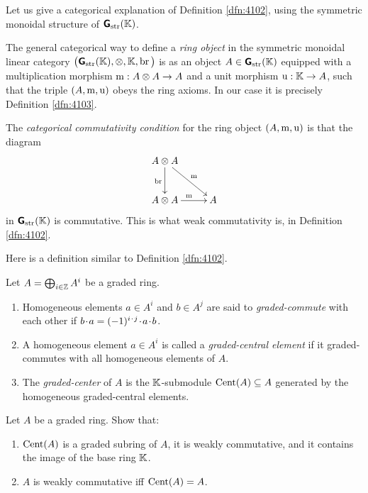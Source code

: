 \begin{rem} \label{rem:4103}
Let us give a categorical explanation of Definition \ref{dfn:4102}, using the 
symmetric monoidal structure of $\boldsymbol{\mathsf{G}}_{\mathrm{str}}(\mathbb{K})$. 

The general categorical way to define a {\em ring object} in the symmetric
monoidal linear category
$\bigl( \boldsymbol{\mathsf{G}}_{\mathrm{str}}(\mathbb{K}), \otimes, \mathbb{K}, \operatorname{br} \big)$
is as an object $A \in \boldsymbol{\mathsf{G}}_{\mathrm{str}}(\mathbb{K})$ equipped with a 
multiplication morphism 
$\operatorname{m} : A \otimes A \to A$
and a unit morphism $\operatorname{u} : \mathbb{K} \to A$, such that the triple 
$(A, \operatorname{m}, \operatorname{u})$ obeys the ring axioms. 
In our case it is precisely Definition \ref{dfn:4103}.

The {\em categorical commutativity condition} for the ring object 
$(A, \operatorname{m}, \operatorname{u})$  is that the diagram 
\[ \UseTips  \xymatrix @C=6ex @R=6ex {
A \ot A
\ar[dr]^{\opn{m}}
\ar[d]_{\opn{br}}
\\
A \ot A
\ar[r]^{\opn{m}}
&
A
} \]
in $\boldsymbol{\mathsf{G}}_{\mathrm{str}}(\mathbb{K})$ is commutative. This is what weak commutativity 
is, in Definition \ref{dfn:4102}.
\end{rem}

Here is a definition similar to Definition \ref{dfn:4102}.

\begin{dfn} \label{dfn:4105}
Let $A = \bigoplus_{i \in \mathbb{Z}} A^i$ be a graded ring.
\begin{enumerate}
\item Homogeneous elements $a \in A^i$ and $b \in A^j$ are said to {\em 
graded-commute} with each other if 
$b \mspace{1.5mu}{\cdot}\mspace{1.5mu} a = (-1)^{i \mspace{1.5mu}{\cdot}\mspace{1.5mu} j} \mspace{1.5mu}{\cdot}\mspace{1.5mu} a \mspace{1.5mu}{\cdot}\mspace{1.5mu} b$.

\item A homogeneous element $a \in A^i$ is called a {\em graded-central 
element} 
if it graded-commutes with all homogeneous elements of $A$. 

\item The {\em graded-center} of $A$ is the $\mathbb{K}$-submodule
$\operatorname{Cent}(A) \subseteq A$ generated by the homogeneous 
graded-central elements.
\end{enumerate}
\end{dfn}

\begin{exer} \label{exer:1706}
Let $A$ be a graded ring. Show that:
\begin{enumerate}
\item $\operatorname{Cent}(A)$ is a graded subring of $A$, it is weakly commutative, and 
it contains the image of the base ring $\mathbb{K}$. 

\item $A$ is weakly commutative iff $\operatorname{Cent}(A) = A$. 
\end{enumerate}
\end{exer}

